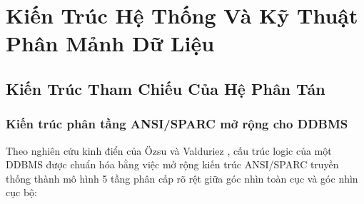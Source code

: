 \documentclass[12pt,a4paper]{report}
\begin{document}
\chapter{Kiến Trúc Hệ Thống Và Kỹ Thuật Phân Mảnh Dữ Liệu}

\section{Kiến Trúc Tham Chiếu Của Hệ Phân Tán}

\subsection{Kiến trúc phân tầng ANSI/SPARC mở rộng cho DDBMS}
Theo nghiên cứu kinh điển của Özsu và Valduriez \cite{ozsu}, cấu trúc logic của một DDBMS được chuẩn hóa bằng việc mở rộng kiến trúc ANSI/SPARC truyền thống thành mô hình 5 tầng phân cấp rõ rệt giữa góc nhìn toàn cục và góc nhìn cục bộ:
\end{document}
